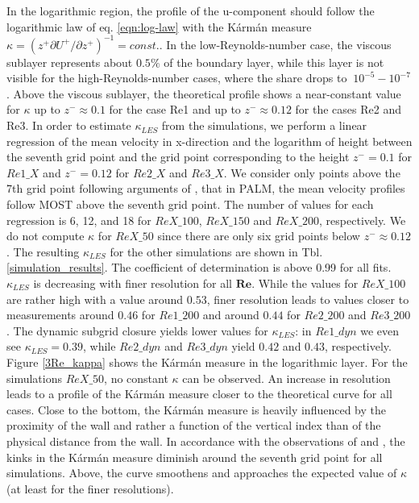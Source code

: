 \documentclass[a4paper,11pt]{article}
\newcommand{\RE}{\mathbf{Re}}
\begin{document}
In the logarithmic region, the profile of the u-component should follow the logarithmic law of eq. \ref{eqn:log-law} with the K\'arm\'an measure $\kappa = (z^+\partial U^+/\partial z^+)^{-1}=const.$. In the low-Reynolds-number case, the viscous sublayer represents about $0.5\%$ of the boundary layer, while this layer is not visible for the high-Reynolds-number cases, where the share drops to $~10^{-5}-10^{-7}$. Above the viscous sublayer, the theoretical profile shows a near-constant value for $\kappa$ up to $z^-\approx0.1$ for the case Re1 and up to $z^-\approx0.12$ for the cases Re2 and Re3. In order to estimate $\kappa_{LES}$ from the simulations, we perform a linear regression of the mean velocity in x-direction and the logarithm of height between the seventh grid point and the grid point corresponding to the height $z^-=0.1$ for $Re1\_X$ and $z^-=0.12$ for $Re2\_X$ and $Re3\_X$. We consider only points above the 7th grid point following arguments of \cite{maronga2020improved}, that in PALM, the mean velocity profiles follow MOST above the seventh grid point. The number of values for each regression is 6, 12, and 18 for $ReX\_100$, $ReX\_150$ and $ReX\_200$, respectively.  We do not compute $\kappa$ for $ReX\_50$ since there are only six grid points below $z^-\approx 0.12$. The resulting $\kappa_{LES}$ for the other simulations are shown in Tbl. \ref{simulation_results}. The coefficient of determination is above 0.99 for all fits. $\kappa_{LES}$ is decreasing with finer resolution for all $\RE$. While the values for $ReX\_100$ are rather high with a value around $0.53$, finer resolution leads to values closer to measurements around $0.46$ for $Re1\_200$ and around $0.44$ for $Re2\_200$ and $Re3\_200$. The dynamic subgrid closure yields lower values for $\kappa_{LES}$: in $Re1\_dyn$ we even see $\kappa_{LES}=0.39$, while $Re2\_dyn$ and $Re3\_dyn$ yield $0.42$ and $0.43$, respectively. Figure \ref{3Re_kappa} shows the K\'arm\'an measure in the logarithmic layer. For the simulations $ReX\_50$, no constant $\kappa$ can be observed. An increase in resolution leads to a profile of the K\'arm\'an measure closer to the theoretical curve for all cases. Close to the bottom, the K\'arm\'an measure is heavily influenced by the proximity of the wall and rather a function of the vertical index than of the physical distance from the wall. In accordance with the observations of \cite{maronga2014monin} and \cite{maronga2017formulation}, the kinks in the K\'arm\'an measure diminish around the seventh grid point for all simulations. Above, the curve smoothens and approaches the expected value of $\kappa$ (at least for the finer resolutions).  
\end{document}
